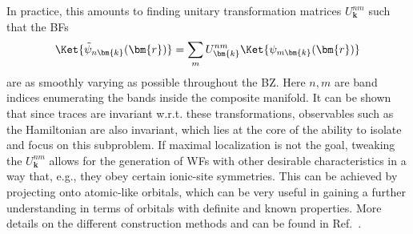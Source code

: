 In practice, this amounts to finding unitary transformation matrices $U^{nm}_{\bm{k}}$ such that the BFs
\begin{equation}
	\Ket{\tilde{\psi}_{n\bm{k}}(\bm{r})} = \sum_m U^{nm}_{\bm{k}} \Ket{\psi_{m\bm{k}}(\bm{r})}
\end{equation}
are as smoothly varying as possible throughout the BZ.
Here $n,m$ are band indices enumerating the bands inside the composite manifold.
It can be shown that since traces are invariant w.r.t. these transformations, observables such as the Hamiltonian are also invariant, which lies at the core of the ability to isolate and focus on this subproblem.
If maximal localization is not the goal, tweaking the $U^{nm}_{\bm{k}}$ allows for the generation of WFs with other desirable characteristics in a way that, e.g., they obey certain ionic-site symmetries.
This can be achieved by projecting onto atomic-like orbitals, which can be very useful in gaining a further understanding in terms of orbitals with definite and known properties.
More details on the different construction methods and can be found in Ref.~\cite{Marzari2012}.

